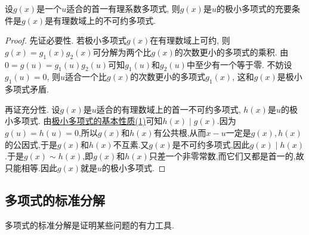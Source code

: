 \documentclass[../../main.tex]{subfiles}%
\begin{document}
\begin{proposition}[极小多项式式的充要条件]\label{proposition:极小多项式式的充要条件}
设\(g(x)\)是一个\(u\)适合的首一有理系数多项式, 则\(g(x)\)是\(u\)的极小多项式的充要条件是\(g(x)\)是有理数域上的不可约多项式.
\end{proposition}
\begin{proof}

先证必要性. 若极小多项式\(g(x)\)在有理数域上可约, 则\(g(x)=g_1(x)g_2(x)\)可分解为两个比\(g(x)\)的次数更小的多项式的乘积. 由\(0 = g(u)=g_1(u)g_2(u)\)可知\(g_1(u)\)和\(g_2(u)\)中至少有一个等于零. 不妨设\(g_1(u)=0\), 则\(u\)适合一个比\(g(x)\)的次数更小的多项式\(g_1(x)\), 这和\(g(x)\)是极小多项式矛盾. 

再证充分性. 设\(g(x)\)是\(u\)适合的有理数域上的首一不可约多项式, \(h(x)\)是\(u\)的极小多项式. 由\hyperref[proposition:极小多项式的基本性质]{极小多项式的基本性质(1)}可知\(h(x)\mid g(x)\).因为$g(u)=h(u)=0$,所以$g(x)$和$h(x)$有公共根,从而$x-u$一定是$g(x),h(x)$的公因式,于是$g(x)$和$h(x)$不互素.又\(g(x)\)是不可约多项式,因此$g(x)\mid h(x)$.于是$g(x)\sim h(x)$,即\(g(x)\)和\(h(x)\)只差一个非零常数,而它们又都是首一的,故只能相等.因此\(g(x)\)就是\(u\)的极小多项式.

\end{proof}

\subsection{多项式的标准分解}

多项式的标准分解是证明某些问题的有力工具.
\end{document}
